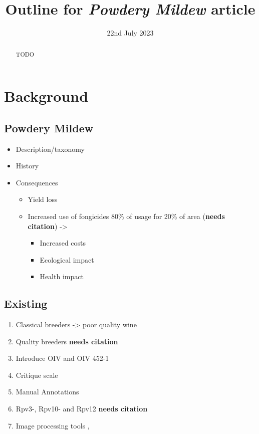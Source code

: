 \documentclass[english]{article}
\title{ Outline for \textit{Powdery Mildew} article}
\date{22nd July 2023}
\author{}
\begin{document}
\maketitle

\begin{changemargin}{60pt}{60pt}
	\begin{abstract}
		TODO
	\end{abstract}
\end{changemargin}

\tableofcontents

\section{Background}

\subsection{Powdery Mildew}

\begin{itemize}
	\item Description/taxonomy
	\item History \parencite*{fontaineEuropeBridgeheadWorldwide2021}
	\item Consequences
	      \begin{itemize}
		      \item Yield loss
		      \item Increased use of fongicides 80\% of usage for 20\% of area (\textbf{needs citation}) ->
		            \begin{itemize}
			            \item Increased costs
			            \item Ecological impact
			            \item Health impact
		            \end{itemize}
	      \end{itemize}
\end{itemize}

\subsection{Existing}

\begin{enumerate}
	\item Classical breeders -> poor quality wine
	\item Quality breeders \textbf{needs citation}
	\item Introduce OIV and OIV 452-1
	\item Critique scale \parencite{possamaiPhenotypingQTLIdentification2022}
	\item Manual Annotations
	\item Rpv3-, Rpv10- and Rpv12 \textbf{needs citation}
	\item Image processing tools \parencite{hernandezAssessmentDownyMildew2022}, \parencite{zendlerHighthroughputPhenotypingLeaf2021}
\end{enumerate}
\end{document}
